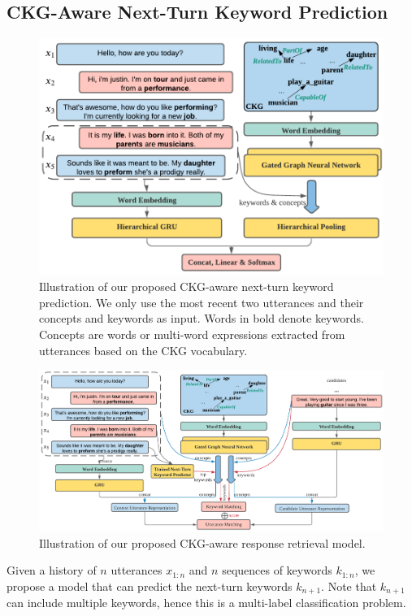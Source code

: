 \documentclass[letterpaper]{article} %
\begin{document}
\subsection{CKG-Aware Next-Turn Keyword Prediction}
\label{sec: keyword prediction}
\begin{figure}[!t]
\centering
\includegraphics[width=1\linewidth]{images/keyword_prediction_v2.pdf}
\caption{Illustration of our proposed CKG-aware next-turn keyword prediction. We only use the most recent two utterances and their concepts and keywords as input. Words in bold denote keywords. Concepts are words or multi-word expressions extracted from utterances based on the CKG vocabulary.}
\label{fig: keyword prediction}
\end{figure}
\begin{figure}[!t]
\centering
\includegraphics[width=0.9\linewidth]{images/response_retrieval_v2.pdf}
\caption{Illustration of our proposed CKG-aware response retrieval model.}
\label{fig: response retrieval}
\end{figure}
Given a history of $n$ utterances $x_{1:n}$ and $n$ sequences of keywords $k_{1:n}$, we propose a model that can predict the next-turn keywords $k_{n+1}$. Note that $k_{n+1}$ can include multiple keywords, hence this is a multi-label classification problem.
\end{document}
